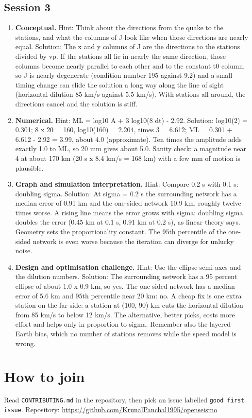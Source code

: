 \documentclass[11pt,a4paper]{article}
\begin{document}
\subsection*{Session 3}
\begin{enumerate}[nosep]
\item \textbf{Conceptual.} Hint: Think about the directions from the quake to the stations, and what the columns of J look like when those directions are nearly equal. Solution: The x and y columns of J are the directions to the stations divided by vp. If the stations all lie in nearly the same direction, those columns become nearly parallel to each other and to the constant t0 column, so J is nearly degenerate (condition number 195 against 9.2) and a small timing change can slide the solution a long way along the line of sight (horizontal dilution 85 km/s against 5.5 km/s). With stations all around, the directions cancel and the solution is stiff.
\item \textbf{Numerical.} Hint: ML = log10 A + 3 log10(8 dt) - 2.92. Solution: log10(2) = 0.301; 8 x 20 = 160, log10(160) = 2.204, times 3 = 6.612; ML = 0.301 + 6.612 - 2.92 = 3.99, about 4.0 (approximate). Ten times the amplitude adds exactly 1.0 to ML, so 20 mm gives about 5.0. Sanity check: a magnitude near 4 at about 170 km (20 s x 8.4 km/s = 168 km) with a few mm of motion is plausible.
\item \textbf{Graph and simulation interpretation.} Hint: Compare 0.2 s with 0.1 s: doubling sigma. Solution: At sigma = 0.2 s the surrounding network has a median error of 0.91 km and the one-sided network 10.9 km, roughly twelve times worse. A rising line means the error grows with sigma: doubling sigma doubles the error (0.45 km at 0.1 s, 0.91 km at 0.2 s), as linear theory says. Geometry sets the proportionality constant. The 95th percentile of the one-sided network is even worse because the iteration can diverge for unlucky noise.
\item \textbf{Design and optimisation challenge.} Hint: Use the ellipse semi-axes and the dilution numbers. Solution: The surrounding network has a 95 percent ellipse of about 1.0 x 0.9 km, so yes. The one-sided network has a median error of 5.6 km and 95th percentile near 20 km: no. A cheap fix is one extra station on the far side: a station at (100, 90) km cuts the horizontal dilution from 85 km/s to below 12 km/s. The alternative, better picks, costs more effort and helps only in proportion to sigma. Remember also the layered-Earth bias, which no number of stations removes while the speed model is wrong.
\end{enumerate}

\section{How to join}
Read \texttt{CONTRIBUTING.md} in the repository, then pick an issue labelled \texttt{good first issue}. Repository: \url{https://github.com/KrunalPanchal1995/openseismo}
\end{document}
